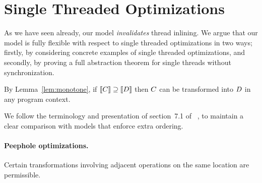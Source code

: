 \newcommand{\rel}{{\tt rel}}


\section{Single Threaded Optimizations}

As we have seen already, our model {\em invalidates} thread inlining.  We
argue that our model is fully flexible with respect to single threaded
optimizations in two ways; firstly, by considering concrete examples of
single threaded optimizations, and secondly, by proving a full abstraction
theorem for single threads without synchronization.  



By Lemma~\ref{lem:monotone}, if $\llbracket C\rrbracket \supseteq \llbracket D\rrbracket$
then $C$ can be transformed into $D$ in any program context.

We follow the terminology and presentation of section~7.1 of
~\citet{Dolan:2018:BDR:3192366.3192421}, to maintain a clear comparison with models that enforce extra ordering.

\paragraph*{Peephole optimizations. } 
Certain transformations involving adjacent operations on the same location
are permissible. 
 
